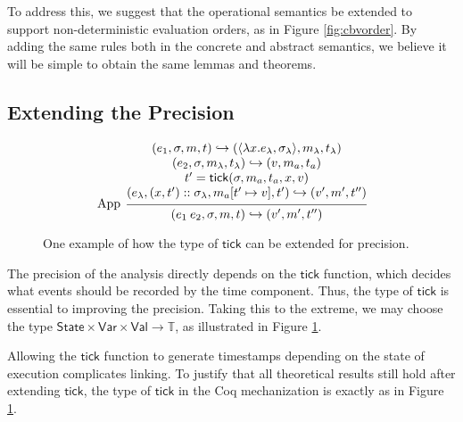 \documentclass[acmsmall,screen,review]{acmart}\settopmatter{printfolios=true,printccs=false,printacmref=false}
\theoremstyle{acmdefinition}
\newcommand*{\cons}{::}
\newcommand*{\ExprVar}{\mathsf{Var}}
\newcommand*{\Time}{\mathbb{T}}
\newcommand*{\ctx}{\sigma}
\newcommand*{\Value}{\mathsf{Val}}
\newcommand*{\mem}{m}
\newcommand*{\State}{\mathsf{State}}
\newcommand*{\semarrow}{\hookrightarrow}
\newcommand*{\tick}{\mathsf{tick}}
\begin{document}
To address this, we suggest that the operational semantics be extended to support non-deterministic evaluation orders, as in Figure \ref{fig:cbvorder}.
By adding the same rules both in the concrete and abstract semantics, we believe it will be simple to obtain the same lemmas and theorems.

\subsection{Extending the Precision}
\begin{figure}[h!]
  \scriptsize
  \begin{flushright}
    \fbox{$(e,\ctx,\mem,t)\semarrow(V,\mem',t')\text{ or }(e',\ctx',\mem',t')$}
  \end{flushright}
  \[
    \begin{prooftree}
      \hypo{
        \begin{matrix}
          (e_{1}, \ctx, \mem, t)
          \semarrow
          (\langle\lambda x.e_{\lambda}, \ctx_{\lambda}\rangle, \mem_{\lambda}, t_{\lambda}) \\
          (e_{2}, \ctx, \mem_{\lambda}, t_{\lambda})
          \semarrow
          (v, \mem_{a}, t_{a})                                                               \\
          t'=\tick(\sigma,\mem_{a},t_{a},x,v)                                                \\
          (e_{\lambda}, (x, t')\cons \ctx_{\lambda}, \mem_{a}[t'\mapsto v], t')
          \semarrow
          (v', \mem',t'')
        \end{matrix}
      }
      \infer[left label={App}]1{
      (e_{1}\:e_{2}, \ctx, \mem, t)
      \semarrow
      (v', \mem',t'')
      }
    \end{prooftree}
  \]
  \caption{One example of how the type of $\tick$ can be extended for precision.}
  \label{fig:highprecision}
\end{figure}
The precision of the analysis directly depends on the $\tick$ function, which decides what events should be recorded by the time component.
Thus, the type of $\tick$ is essential to improving the precision.
Taking this to the extreme, we may choose the type $\State\times\ExprVar\times\Value\rightarrow\Time$, as illustrated in Figure \ref{fig:highprecision}.

Allowing the $\tick$ function to generate timestamps depending on the state of execution complicates linking.
To justify that all theoretical results still hold after extending $\tick$, the type of $\tick$ in the Coq mechanization is exactly as in Figure \ref{fig:highprecision}.
\end{document}
